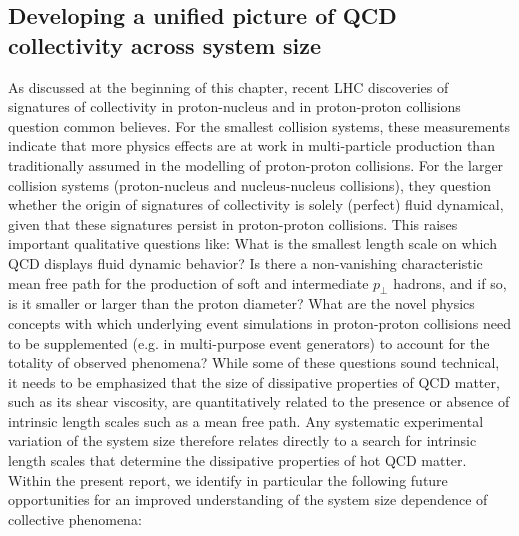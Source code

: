 \documentclass[../report.tex]{subfiles}
\begin{document}
\subsection{Developing a unified picture of QCD collectivity across system size}
As discussed at the beginning of this chapter, recent LHC discoveries of signatures of collectivity in proton-nucleus and in proton-proton collisions question common believes. For the smallest collision systems, these measurements indicate that more physics effects are at work in multi-particle production than traditionally assumed in the modelling of proton-proton collisions. For the larger collision systems (proton-nucleus and nucleus-nucleus collisions), they question whether the origin of signatures of collectivity is solely (perfect) fluid dynamical, given that these signatures persist in proton-proton collisions. This raises important qualitative questions like: What is the smallest length scale on which QCD displays fluid dynamic behavior? Is there a non-vanishing characteristic mean free path for the production of soft and intermediate $p_\perp$ hadrons, and if so, is it smaller or larger than the proton diameter? What are the novel physics concepts with which underlying event simulations in proton-proton collisions need to be supplemented (e.g. in multi-purpose event generators) to account for the totality of observed phenomena?  While some of these questions sound technical, it needs to be emphasized that the size of dissipative properties of QCD matter, such as its shear viscosity, are quantitatively related to the presence or absence of intrinsic length scales such as a mean free path. Any systematic experimental variation of the system size therefore relates directly to a search for intrinsic length scales that determine the dissipative properties of hot QCD matter. Within the present report, we identify in particular the following future opportunities for an improved understanding of the system size dependence of collective phenomena:
\end{document}
